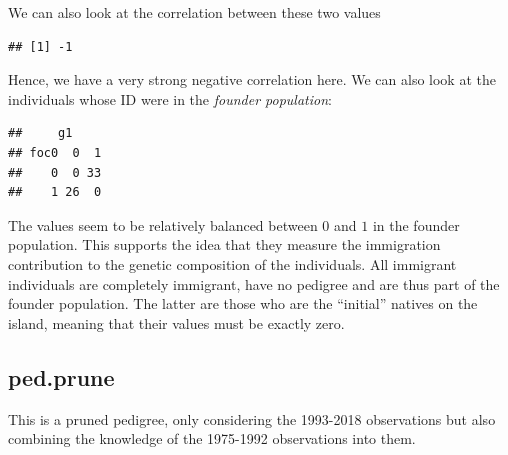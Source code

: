 We can also look at the correlation between these two values

\begin{Shaded}
\begin{Highlighting}[]
\SpecialCharTok{$}\SpecialCharTok{$}
\end{Highlighting}
\end{Shaded}

\begin{verbatim}
## [1] -1
\end{verbatim}

Hence, we have a very strong negative correlation here. We can also look
at the individuals whose ID were in the \emph{founder population}:

\begin{Shaded}
\begin{Highlighting}[]
\OtherTok{\textless{}{-}}\NormalTok{ d.ped[}\SpecialCharTok{$}\NormalTok{]}
\NormalTok{(d.Q[}\SpecialCharTok{$}
          \NormalTok{(}\NormalTok{, }\NormalTok{)])}
\end{Highlighting}
\end{Shaded}

\begin{verbatim}
##     g1
## foc0  0  1
##    0  0 33
##    1 26  0
\end{verbatim}

The values seem to be relatively balanced between \(0\) and \(1\) in the
founder population. This supports the idea that they measure the
immigration contribution to the genetic composition of the individuals.
All immigrant individuals are completely immigrant, have no pedigree and
are thus part of the founder population. The latter are those who are
the ``initial'' natives on the island, meaning that their values must be
exactly zero.

\hypertarget{ped.prune}{%
\subsection*{ped.prune}\label{ped.prune}}

This is a pruned pedigree, only considering the 1993-2018 observations
but also combining the knowledge of the 1975-1992 observations into
them.


